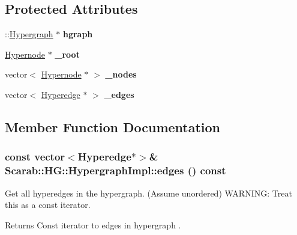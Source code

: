 \subsection*{Protected Attributes}
\begin{DoxyCompactItemize}
\item 
\hypertarget{classScarab_1_1HG_1_1HypergraphImpl_aa7192cf8f168e5bfed67a8faf85c8cb4}{
::\hyperlink{classHypergraph}{Hypergraph} $\ast$ {\bfseries hgraph}}
\label{classScarab_1_1HG_1_1HypergraphImpl_aa7192cf8f168e5bfed67a8faf85c8cb4}

\item 
\hypertarget{classScarab_1_1HG_1_1HypergraphImpl_a7035fdae4c04d0752aaaf1e7eba7600e}{
\hyperlink{classScarab_1_1HG_1_1Hypernode}{Hypernode} $\ast$ {\bfseries \_\-root}}
\label{classScarab_1_1HG_1_1HypergraphImpl_a7035fdae4c04d0752aaaf1e7eba7600e}

\item 
\hypertarget{classScarab_1_1HG_1_1HypergraphImpl_a4cc57d9255e2f09714c5913d67cd0554}{
vector$<$ \hyperlink{classScarab_1_1HG_1_1Hypernode}{Hypernode} $\ast$ $>$ {\bfseries \_\-nodes}}
\label{classScarab_1_1HG_1_1HypergraphImpl_a4cc57d9255e2f09714c5913d67cd0554}

\item 
\hypertarget{classScarab_1_1HG_1_1HypergraphImpl_a56fb710140f3359646b1a17cb0417d74}{
vector$<$ \hyperlink{classScarab_1_1HG_1_1Hyperedge}{Hyperedge} $\ast$ $>$ {\bfseries \_\-edges}}
\label{classScarab_1_1HG_1_1HypergraphImpl_a56fb710140f3359646b1a17cb0417d74}

\end{DoxyCompactItemize}


\subsection{Member Function Documentation}
\hypertarget{classScarab_1_1HG_1_1HypergraphImpl_a0c8373e545fe59b0cb7036b4751508e1}{
\subsubsection[{edges}]{\setlength{\rightskip}{0pt plus 5cm}const vector$<${\bf Hyperedge}$\ast$$>$\& Scarab::HG::HypergraphImpl::edges () const}}
\label{classScarab_1_1HG_1_1HypergraphImpl_a0c8373e545fe59b0cb7036b4751508e1}
Get all hyperedges in the hypergraph. (Assume unordered) WARNING: Treat this as a const iterator. \begin{DoxyReturn}{Returns}
Const iterator to edges in hypergraph . 
\end{DoxyReturn}


